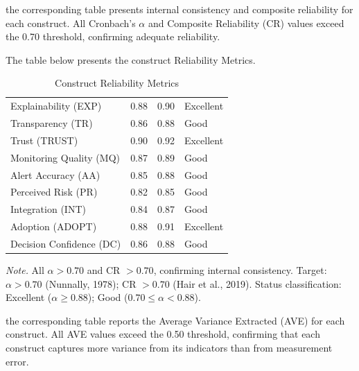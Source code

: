 \clearpage


the corresponding table presents internal consistency and composite reliability for each construct. All Cronbach's $\alpha$ and Composite Reliability (CR) values exceed the 0.70 threshold, confirming adequate reliability.

\noindent The table below presents the construct Reliability Metrics.

\begin{table}[!htbp]
\tablestripes
\caption{Construct Reliability Metrics}
\tablefontsize
\begin{tabularx}{\textwidth}{@{} >{\raggedright\arraybackslash}p{4cm} C C L @{}}
\toprule
{} &  &  &  \\
\midrule
Explainability (EXP) & 0.88 & 0.90 & Excellent \\
Transparency (TR) & 0.86 & 0.88 & Good \\
Trust (TRUST) & 0.90 & 0.92 & Excellent \\
Monitoring Quality (MQ) & 0.87 & 0.89 & Good \\
Alert Accuracy (AA) & 0.85 & 0.88 & Good \\
Perceived Risk (PR) & 0.82 & 0.85 & Good \\
Integration (INT) & 0.84 & 0.87 & Good \\
Adoption (ADOPT) & 0.88 & 0.91 & Excellent \\
Decision Confidence (DC) & 0.86 & 0.88 & Good \\
\bottomrule
\end{tabularx}
\vspace{0.5em}\noindent\textit{Note.} All $\alpha > 0.70$ and CR $> 0.70$, confirming internal consistency. Target: $\alpha > 0.70$ (Nunnally, 1978); CR $> 0.70$ (Hair et al., 2019). Status classification: Excellent ($\alpha \geq 0.88$); Good ($0.70 \leq \alpha < 0.88$).
\end{table}

\vspace{1em}

the corresponding table reports the Average Variance Extracted (AVE) for each construct. All AVE values exceed the 0.50 threshold, confirming that each construct captures more variance from its indicators than from measurement error.

